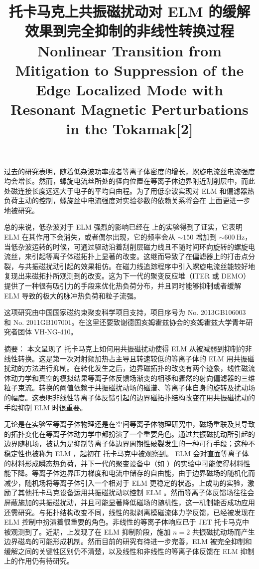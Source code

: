 \east 过去的研究表明，随着低杂波功率或者等离子体密度的增长，螺旋电流丝电流强度均会增长。然而，螺旋电流丝所处的径向位置在等离子体边界附近刮削层中，而此处磁连接长度远远大于电子的平均自由程。为了用低杂波实现对 ELM 和偏滤器热负荷主动的控制，螺旋丝中电流强度对实验参数的依赖关系将会在 \east 上面更进一步地被研究。

总的来说，低杂波对于 ELM 强烈的影响已经在 \east 上的实验得到了证实，它表明 ELM 在其作用下会消失，或者偶尔出现，它的频率会从 $\sim 150$ 增加到 $\sim\SI{600}{\hertz}$，当低杂波运转的时候，可通过驱动沿着刮削层磁力线且不随时间环向旋转的螺旋电流丝，来引起等离子体磁拓扑上显著的改变。这继而导致了在偏滤器上的打击点分裂，与共振磁扰动引起的效果相仿。在磁力线追踪程序中引入螺旋电流丝能较好地复现出来磁拓扑所观测到的改变。这为下一代的聚变反应堆（ITER 或 DEMO）提供了一种很有吸引力的手段来优化热负荷分布，并且同时能够抑制或者缓解 ELM 导致的极大的脉冲热负荷和粒子流强。

这项研究由中国国家磁约束聚变科学项目支持，项目序号为 No. 2013GB106003 和 No. 2011GB107001。在这里还要致谢德国亥姆霍兹协会的亥姆霍兹大学青年研究者团体  VH-NG-410。



\title{{\heiti \east 托卡马克上共振磁扰动对 ELM 的缓解效果到完全抑制的非线性转换过程}\\Nonlinear Transition from Mitigation to Suppression of the Edge Localized Mode with Resonant Magnetic Perturbations in the \east Tokamak[2]}

{\heiti 摘要：} {\kaishu 本文呈现了 \east 托卡马克上如何用共振磁扰动使得 ELM 从被减弱到抑制的非线性转换。这是第一次对射频加热占主导且转速较低的等离子体的 ELM 用共振磁扰动的方法进行抑制。在转化发生之后，边界磁拓扑的改变有两个迹象，线性磁流体动力学和真空的模拟结果等离子体反馈场渐变的相移和骤然的射向偏滤器的三维粒子束流。转换的阈值依赖于共振磁扰动场的磁谱、等离子体自身的旋转及扰动场的幅度。这表明非线性等离子体反馈引起的边界磁拓扑结构改变在用共振磁扰动的手段抑制 ELM 时很重要。}

无论是在实验室等离子体物理还是在空间等离子体物理研究中，磁场重联及其导致的拓扑变化在等离子体动力学中都扮演了一个重要角色。通过共振磁扰动所引起的边界随机场，被认为是抑制等离子体边界周期性破裂发生的一种可行手段；这种不稳定性也被称为 ELM ，起初在 \ddd 托卡马克中被观察到。 ELM 会对直面等离子体的材料形成瞬态热负荷，并下一代的聚变设备中（如 \iter）的实验中可能使得材料性能下降。等离子体边界压力梯度和电流中储存的自由能，由于边界磁场的随机化而减少，随机场将等离子体引入一个相对于 ELM 更稳定的状态。\ddd 上成功的实验，激励了其他托卡马克设备运用共振磁扰动以控制 ELM 。然而等离子体反馈场往往会屏蔽施加的共振磁扰动，并且可能显著降低磁场的随机性，这一机制能否成功应用还需研究。与拓扑结构改变不同，线性的拟剥离模磁流体力学反馈，已经被发现在 ELM 控制中扮演着很重要的角色。非线性的等离子体响应已于 JET 托卡马克中被观测到了。近期，\ddd 上发现了在 ELM 抑制阶段，施加 $n=2$ 共振磁扰动场而产生边界磁岛的可能形成机制。然而目前的研究有待进一步完善，ELM 被完全抑制和缓解之间的关键性区别仍不清楚，以及线性和非线性的等离子体反馈在 ELM 抑制上的作用仍有待研究。

